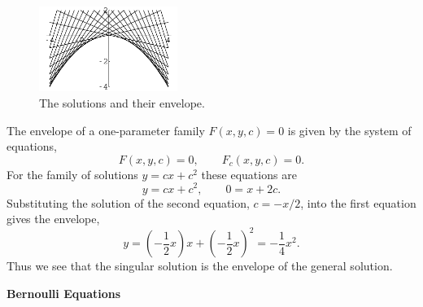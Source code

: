 {\begin{Solution}
\begin{enumerate}
    \begin{figure}[tb!]
      \begin{center}
        \includegraphics[width=0.4\textwidth]{ode/techniques_nonlinear/clairaut_envelope}
      \end{center}
      \caption{The solutions and their envelope.}
      \label{clairaut_envelope}
    \end{figure}

    The envelope of a one-parameter family $F(x,y,c) = 0$ is given by the 
    system of equations,
    \[
    F(x,y,c) = 0, \qquad F_c(x,y,c) = 0.
    \]
    For the family of solutions $y = c x + c^2$ these equations are
    \[
    y = c x + c^2, \qquad 0 = x + 2 c.
    \]
    Substituting the solution of the second equation, $c = - x/2$, into the
    first equation gives the envelope,
    \[
    y = \left( - \frac{1}{2} x \right) x + \left( - \frac{1}{2} x \right)^2
    = - \frac{1}{4} x^2.
    \]
    Thus we see that the singular solution is the envelope of the general solution.
  \end{enumerate}
\end{Solution}







\begin{large}
  \noindent
  \textbf{Bernoulli Equations}
\end{large}







}
